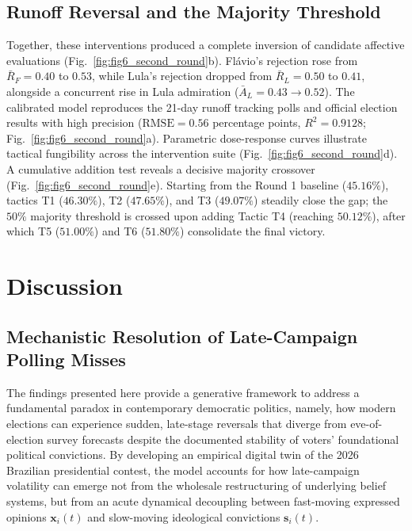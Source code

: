 \documentclass[a4paper,fleqn]{cas-dc}
\begin{document}
\subsection{Runoff Reversal and the Majority Threshold}
\label{subsec:results_runoff}
Together, these interventions produced a complete inversion of candidate affective evaluations (Fig.~\ref{fig:fig6_second_round}b). Flávio's rejection rose from $\bar{R}_F = 0.40$ to $0.53$, while Lula's rejection dropped from $\bar{R}_L = 0.50$ to $0.41$, alongside a concurrent rise in Lula admiration ($\bar{A}_L = 0.43 \to 0.52$). The calibrated model reproduces the 21-day runoff tracking polls and official election results with high precision ($\mathrm{RMSE} = 0.56$ percentage points, $R^2 = 0.9128$; Fig.~\ref{fig:fig6_second_round}a). Parametric dose-response curves illustrate tactical fungibility across the intervention suite (Fig.~\ref{fig:fig6_second_round}d). A cumulative addition test reveals a decisive majority crossover (Fig.~\ref{fig:fig6_second_round}e). Starting from the Round 1 baseline ($45.16\%$), tactics T1 ($46.30\%$), T2 ($47.65\%$), and T3 ($49.07\%$) steadily close the gap; the $50\%$ majority threshold is crossed upon adding Tactic T4 (reaching $50.12\%$), after which T5 ($51.00\%$) and T6 ($51.80\%$) consolidate the final victory.

\section{Discussion}
\label{sec:discussion}

\subsection{Mechanistic Resolution of Late-Campaign Polling Misses}
The findings presented here provide a generative framework to address a fundamental paradox in contemporary democratic politics, namely, how modern elections can experience sudden, late-stage reversals that diverge from eve-of-election survey forecasts despite the documented stability of voters' foundational political convictions. By developing an empirical digital twin of the 2026 Brazilian presidential contest, the model accounts for how late-campaign volatility can emerge not from the wholesale restructuring of underlying belief systems, but from an acute dynamical decoupling between fast-moving expressed opinions $\mathbf{x}_i(t)$ and slow-moving ideological convictions $\mathbf{s}_i(t)$.
\end{document}
